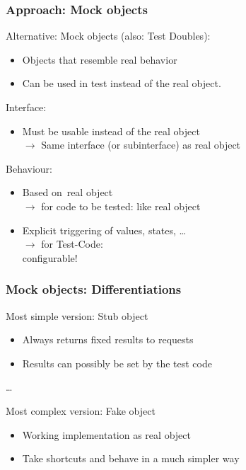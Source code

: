 \begin{frame}
 \frametitle{Approach: Mock objects}
 
Alternative: Mock objects (also: Test Doubles):
\begin{itemize}
  \item Objects that resemble real behavior
  \item Can be used in test instead of the real object.
\end{itemize}
 
\pause

Interface: 
\begin{itemize} 
  \item Must be usable instead of the \glqq real object\grqq\ \\
		$\rightarrow$ Same interface (or subinterface) as real object
\end{itemize}
\pause
 
Behaviour:
\begin{itemize}
  \item \glqq Based on\grqq\ real object\\
   $\rightarrow$ for code to be tested: like real object
  \item Explicit triggering of values, states, \dots\\
   $\rightarrow$ for Test-Code:\\ configurable!
\end{itemize}
\end{frame}


\begin{frame}
 \frametitle{Mock objects: Differentiations}
 
Most simple version: Stub object
\begin{itemize}
  \item Always returns fixed results to requests
  \item Results can possibly be set by the test code
\end{itemize}

 \dots
 \pause
 
Most complex version: Fake object
\begin{itemize}
  \item Working implementation as real object
  \item Take shortcuts and behave in a much simpler way
\end{itemize}
\end{frame}

